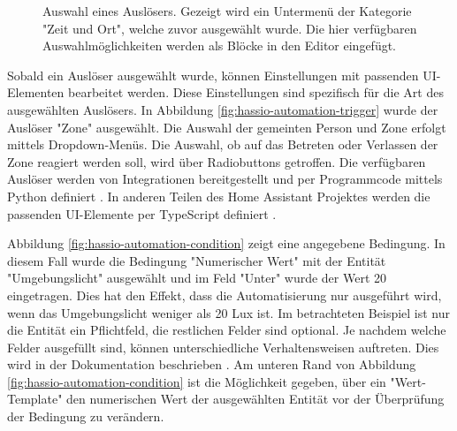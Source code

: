 \begin{figure}[!ht]
\begin{minipage}[t]{\hascwidth}
    \caption[Auswahl eines Auslösers in Home Assistant]{Auswahl eines Auslösers. Gezeigt wird ein Untermenü der Kategorie "Zeit und Ort", welche zuvor ausgewählt wurde. Die hier verfügbaren Auswahlmöglichkeiten werden als Blöcke in den Editor eingefügt.}
    \label{fig:hassio-automation-trigger-select-2}
  \end{minipage}
\end{figure}

Sobald ein Auslöser ausgewählt wurde, können Einstellungen mit passenden \ac{UI}-Elementen bearbeitet werden. Diese Einstellungen sind spezifisch für die Art des ausgewählten Auslösers. In Abbildung \ref{fig:hassio-automation-trigger} wurde der Auslöser "Zone" ausgewählt. Die Auswahl der gemeinten Person und Zone erfolgt mittels Dropdown-Menüs. Die Auswahl, ob auf das Betreten oder Verlassen der Zone reagiert werden soll, wird über Radiobuttons getroffen. Die verfügbaren Auslöser werden von Integrationen bereitgestellt und per Programmcode mittels Python definiert \parencite{openhomefoundationDeviceAutomations2023}. In anderen Teilen des Home Assistant Projektes werden die passenden \ac{UI}-Elemente per TypeScript definiert \parencite{openhomefoundationHomeassistantFrontend}.

Abbildung \ref{fig:hassio-automation-condition} zeigt eine angegebene Bedingung. In diesem Fall wurde  die Bedingung "Numerischer Wert" mit der Entität "Umgebungslicht" ausgewählt und im Feld "Unter" wurde der Wert 20 eingetragen. Dies hat den Effekt, dass die Automatisierung nur ausgeführt wird, wenn das Umgebungslicht weniger als 20 Lux ist. Im betrachteten Beispiel ist nur die Entität ein Pflichtfeld, die restlichen Felder sind optional. Je nachdem welche Felder ausgefüllt sind, können unterschiedliche Verhaltensweisen auftreten. Dies wird in der Dokumentation beschrieben \parencite{openhomefoundationConditions}. Am unteren Rand von Abbildung \ref{fig:hassio-automation-condition} ist die Möglichkeit gegeben, über ein "Wert-Template" den numerischen Wert der ausgewählten Entität vor der Überprüfung der Bedingung zu verändern.

